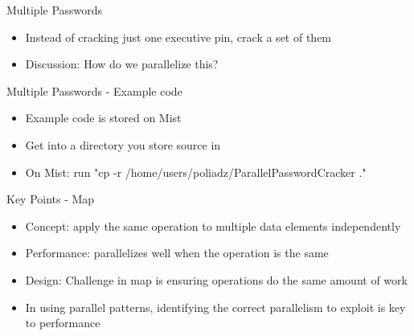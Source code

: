 \documentclass[xcolor=dvipsnames]{beamer}
\begin{document}
	\begin{frame}{Multiple Passwords}
		\begin{itemize}
			\item Instead of cracking just one executive pin, crack a set of them
			\item Discussion: How do we parallelize this?
		\end{itemize}
	\end{frame}
	
	\begin{frame}{Multiple Passwords - Example code}
		\begin{itemize}
      \item Example code is stored on Mist
      \item Get into a directory you store source in 
			\item On Mist: run "cp -r /home/users/poliadz/ParallelPasswordCracker ."
		\end{itemize}
	\end{frame}
	
  \begin{frame}{Key Points - Map}
		\begin{itemize}
      \item Concept: apply the same operation to multiple data elements independently
      \item Performance: parallelizes well when the operation is the same 
      \item Design: Challenge in map is ensuring operations do the same amount of work
			\item In using parallel patterns, identifying the correct parallelism to exploit is key to performance
		\end{itemize}
	\end{frame}
\end{document}
